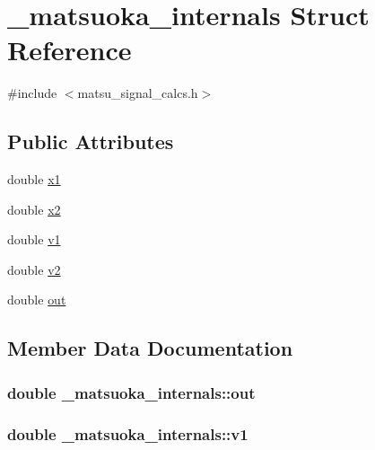 \hypertarget{struct__matsuoka__internals}{}\section{\+\_\+matsuoka\+\_\+internals Struct Reference}
\label{struct__matsuoka__internals}


{\ttfamily \#include $<$matsu\+\_\+signal\+\_\+calcs.\+h$>$}

\subsection*{Public Attributes}
\begin{DoxyCompactItemize}
\item 
double \hyperlink{struct__matsuoka__internals_a6f5497b0eabe8a0a644ef37b7db89baf}{x1}
\item 
double \hyperlink{struct__matsuoka__internals_ab23ab0f50b3bb8250da083b0fd49cb05}{x2}
\item 
double \hyperlink{struct__matsuoka__internals_a3f876d60f71bd25555ba150cd73569ab}{v1}
\item 
double \hyperlink{struct__matsuoka__internals_afb33a7237b71962822b08c2e53f724a1}{v2}
\item 
double \hyperlink{struct__matsuoka__internals_a16f7d3a0a567f660d89d10b1ef6a2d9c}{out}
\end{DoxyCompactItemize}


\subsection{Member Data Documentation}
\subsubsection[{\texorpdfstring{out}{out}}]{\setlength{\rightskip}{0pt plus 5cm}double \+\_\+matsuoka\+\_\+internals\+::out}\hypertarget{struct__matsuoka__internals_a16f7d3a0a567f660d89d10b1ef6a2d9c}{}\label{struct__matsuoka__internals_a16f7d3a0a567f660d89d10b1ef6a2d9c}
\subsubsection[{\texorpdfstring{v1}{v1}}]{\setlength{\rightskip}{0pt plus 5cm}double \+\_\+matsuoka\+\_\+internals\+::v1}\hypertarget{struct__matsuoka__internals_a3f876d60f71bd25555ba150cd73569ab}{}\label{struct__matsuoka__internals_a3f876d60f71bd25555ba150cd73569ab}
